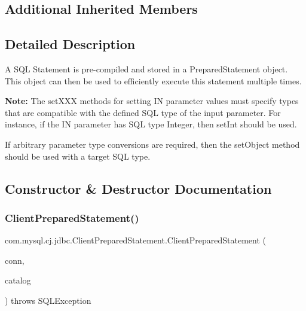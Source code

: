 \subsection*{Additional Inherited Members}


\subsection{Detailed Description}
A S\+QL Statement is pre-\/compiled and stored in a Prepared\+Statement object. This object can then be used to efficiently execute this statement multiple times.

{\bfseries Note\+:} The set\+X\+XX methods for setting IN parameter values must specify types that are compatible with the defined S\+QL type of the input parameter. For instance, if the IN parameter has S\+QL type Integer, then set\+Int should be used. 

If arbitrary parameter type conversions are required, then the set\+Object method should be used with a target S\+QL type. 

\subsection{Constructor \& Destructor Documentation}
\mbox{\label{classcom_1_1mysql_1_1cj_1_1jdbc_1_1_client_prepared_statement_a7a030c8a939d2cd9798b9b6b1ccc52a1}} 
\subsubsection{\texorpdfstring{Client\+Prepared\+Statement()}{ClientPreparedStatement()}\hspace{0.1cm}{\footnotesize\ttfamily [1/3]}}
{\footnotesize\ttfamily com.\+mysql.\+cj.\+jdbc.\+Client\+Prepared\+Statement.\+Client\+Prepared\+Statement (\begin{DoxyParamCaption}\item[{\mbox{\hyperlink{interfacecom_1_1mysql_1_1cj_1_1jdbc_1_1_jdbc_connection}{Jdbc\+Connection}}}]{conn,  }\item[{String}]{catalog }\end{DoxyParamCaption}) throws S\+Q\+L\+Exception\hspace{0.3cm}{\ttfamily [protected]}}

